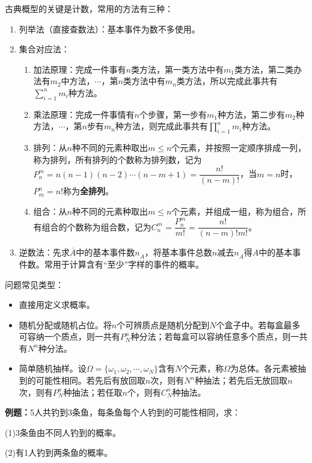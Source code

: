 \documentclass[UTF8, 12pt]{ctexart}
\begin{document}
古典概型的关键是计数，常用的方法有三种：

\begin{enumerate}
    \item 列举法（直接查数法）：基本事件为数不多使用。
    \item 集合对应法：\begin{enumerate}
        \item 加法原理：完成一件事有$n$类方法，第一类方法中有$m_1$类方法，第二类办法有$m_2$中方法，$\cdots$，第$n$类方法中有$m_n$类方法，所以完成此事共有$\sum\limits_{i=1}^nm_i$种方法。 
        \item 乘法原理：完成一件事情有$n$个步骤，第一步有$m_1$种方法，第二步有$m_2$种方法，$\cdots$，第$n$步有$m_n$种方法，则完成此事共有$\prod\limits_{i=1}^nm_i$种方法。   
        \item 排列：从$n$种不同的元素种取出$m\leqslant n$个元素，并按照一定顺序排成一列，称为排列，所有排列的个数称为排列数，记为$P_n^m=n(n-1)(n-2)\cdots(n-m+1)=\dfrac{n!}{(n-m)!}$，当$m=n$时，$P_m^n=n!$称为\textbf{全排列}。
        \item 组合：从$n$种不同的元素种取出$m\leqslant n$个元素，并组成一组，称为组合，所有组合的个数称为组合数，记为$C_n^m=\dfrac{P_n^m}{m!}=\dfrac{n!}{(n-m)!m!}$。
    \end{enumerate}
    \item 逆数法：先求$\overline{A}$中的基本事件数$n_{\overline{A}}$，将基本事件总数$n$减去$n_{\overline{A}}$得$A$中的基本事件数。常用于计算含有“至少”字样的事件的概率。
\end{enumerate}

问题常见类型：

\begin{itemize}
    \item 直接用定义求概率。
    \item 随机分配或随机占位。将$n$个可辨质点是随机分配到$N$个盒子中。若每盒最多可容纳一个质点，则一共有$P_N^n$种分法；若每盒可以容纳任意多个质点，则一共有$N^n$种分法。
    \item 简单随机抽样。设$\Omega=\{\omega_1,\omega_2,\cdots,\omega_N\}$含有$N$个元素，称$\Omega$为总体。各元素被抽到的可能性相同。若先后有放回取$n$次，则有$N^n$种抽法；若先后无放回取$n$次，则有$P_N^n$种抽法；若任取$n$个，则有$C_N^n$种抽法。
\end{itemize}

\textbf{例题：}5人共钓到3条鱼，每条鱼每个人钓到的可能性相同，求：

(1)3条鱼由不同人钓到的概率。

(2)有1人钓到两条鱼的概率。
\end{document}
